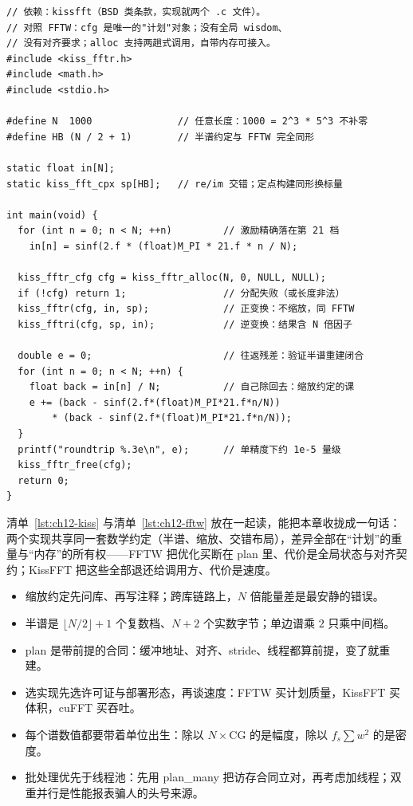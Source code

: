 \documentclass[12pt,a4paper,fontset=fandol]{ctexbook}
\begin{document}
\begin{lstlisting}[style=cstyle,label={lst:ch12-kiss},caption={KissFFT：无 wisdom、无对齐魔法的嵌入式路线（浮点版）}]
// 依赖：kissfft（BSD 类条款，实现就两个 .c 文件）。
// 对照 FFTW：cfg 是唯一的"计划"对象；没有全局 wisdom、
// 没有对齐要求；alloc 支持两趟式调用，自带内存可接入。
#include <kiss_fftr.h>
#include <math.h>
#include <stdio.h>

#define N  1000               // 任意长度：1000 = 2^3 * 5^3 不补零
#define HB (N / 2 + 1)        // 半谱约定与 FFTW 完全同形

static float in[N];
static kiss_fft_cpx sp[HB];   // re/im 交错；定点构建同形换标量

int main(void) {
  for (int n = 0; n < N; ++n)         // 激励精确落在第 21 档
    in[n] = sinf(2.f * (float)M_PI * 21.f * n / N);

  kiss_fftr_cfg cfg = kiss_fftr_alloc(N, 0, NULL, NULL);
  if (!cfg) return 1;                 // 分配失败（或长度非法）
  kiss_fftr(cfg, in, sp);             // 正变换：不缩放，同 FFTW
  kiss_fftri(cfg, sp, in);            // 逆变换：结果含 N 倍因子

  double e = 0;                       // 往返残差：验证半谱重建闭合
  for (int n = 0; n < N; ++n) {
    float back = in[n] / N;           // 自己除回去：缩放约定的课
    e += (back - sinf(2.f*(float)M_PI*21.f*n/N))
        * (back - sinf(2.f*(float)M_PI*21.f*n/N));
  }
  printf("roundtrip %.3e\n", e);      // 单精度下约 1e-5 量级
  kiss_fftr_free(cfg);
  return 0;
}
\end{lstlisting}

清单~\ref{lst:ch12-kiss} 与清单~\ref{lst:ch12-fftw} 放在一起读，能把本章收拢成一句话：两个实现共享同一套数学约定（半谱、缩放、交错布局），差异全部在``计划''的重量与``内存''的所有权——FFTW 把优化买断在 plan 里、代价是全局状态与对齐契约；KissFFT 把这些全部退还给调用方、代价是速度。

\begin{guideline}[title={本章要点}]
\begin{itemize}
\item 缩放约定先问库、再写注释；跨库链路上，$N$ 倍能量差是最安静的错误。
\item 半谱是 $\lfloor N/2 \rfloor + 1$ 个复数档、$N+2$ 个实数字节；单边谱乘 $2$ 只乘中间档。
\item plan 是带前提的合同：缓冲地址、对齐、stride、线程都算前提，变了就重建。
\item 选实现先选许可证与部署形态，再谈速度：FFTW 买计划质量，KissFFT 买体积，cuFFT 买吞吐。
\item 每个谱数值都要带着单位出生：除以 $N \times \mathrm{CG}$ 的是幅度，除以 $f_s \sum w^2$ 的是密度。
\item 批处理优先于线程池：先用 plan\_many 把访存合同立对，再考虑加线程；双重并行是性能报表骗人的头号来源。
\end{itemize}
\end{guideline}
\end{document}
